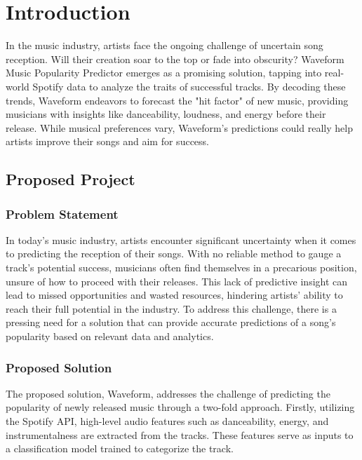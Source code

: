 \documentclass[11pt]{report}
\begin{document}
\tableofcontents
\cleardoublepage

\listoffigures

\cleardoublepage

\listoftables
 
\newpage

\chapter{Introduction}
In the music industry, artists face the ongoing challenge of uncertain song reception. Will their creation soar to the top or fade into obscurity? Waveform Music Popularity Predictor emerges as a promising solution, tapping into real-world Spotify data to analyze the traits of successful tracks. By decoding these trends, Waveform endeavors to forecast the "hit factor" of new music, providing musicians with insights like danceability, loudness, and energy before their release. While musical preferences vary, Waveform's predictions could really help artists improve their songs and aim for success.

\section{Proposed Project}

\subsection{Problem Statement}
In today's music industry, artists encounter significant uncertainty when it comes to predicting the reception of their songs. With no reliable method to gauge a track's potential success, musicians often find themselves in a precarious position, unsure of how to proceed with their releases. This lack of predictive insight can lead to missed opportunities and wasted resources, hindering artists' ability to reach their full potential in the industry. To address this challenge, there is a pressing need for a solution that can provide accurate predictions of a song's popularity based on relevant data and analytics.

\subsection{Proposed Solution}
The proposed solution, Waveform, addresses the challenge of predicting the popularity of newly released music through a two-fold approach. Firstly, utilizing the Spotify API, high-level audio features such as danceability, energy, and instrumentalness are extracted from the tracks. These features serve as inputs to a classification model trained to categorize the track.
\end{document}
